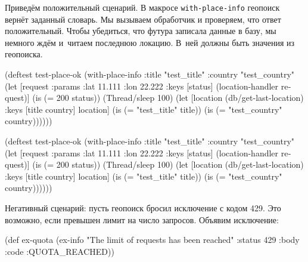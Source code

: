 Приведём положительный сценарий. В макросе \texttt{with\--place\--info} геопоиск
вернёт заданный словарь. Мы вызываем обработчик и проверяем, что ответ
положительный. Чтобы убедиться, что футура записала данные в базу, мы немного
ждём и~читаем последнюю локацию. В~ней должны быть значения из геопоиска.

\ifnarrow

\begin{english}
  \begin{clojure}
(deftest test-place-ok
  (with-place-info
    {:title "test_title"
     :country "test_country"}
    (let [request {:params
                   {:lat 11.111
                    :lon 22.222}}
          {:keys [status]}
          (location-handler request)]
      (is (= 200 status))
      (Thread/sleep 100)
      (let [location
            (db/get-last-location)
            {:keys [title country]}
            location]
        (is (= "test_title" title))
        (is (= "test_country"
               country))))))
  \end{clojure}
\end{english}

\else

\begin{english}
  \begin{clojure}
(deftest test-place-ok
  (with-place-info
    {:title "test_title"
     :country "test_country"}
    (let [request {:params {:lat 11.111 :lon 22.222}}
          {:keys [status]} (location-handler request)]
      (is (= 200 status))
      (Thread/sleep 100)
      (let [location (db/get-last-location)
            {:keys [title country]} location]
        (is (= "test_title" title))
        (is (= "test_country" country))))))
  \end{clojure}
\end{english}

\fi


Негативный сценарий: пусть геопоиск бросил исключение с кодом 429. Это
возможно, если превышен лимит на число запросов. Объявим исключение:

\ifnarrow

\begin{english}
  \begin{clojure}
(def ex-quota
  (ex-info
    "The limit of requests
               has been reached"
    {:status 429
     :body {:code :QUOTA_REACHED}}))
  \end{clojure}
\end{english}

